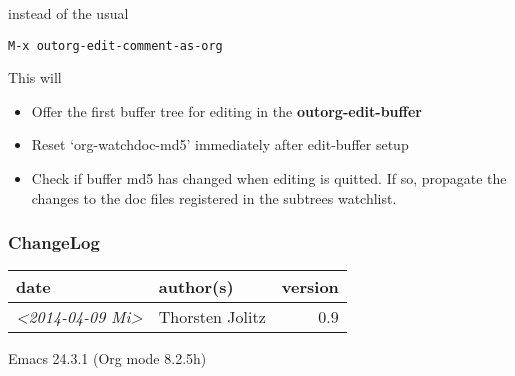 \documentclass[11pt]{article}
\begin{document}
instead of the usual 

\begin{verbatim}
M-x outorg-edit-comment-as-org
\end{verbatim}

This will

\begin{itemize}
\item Offer the first buffer tree for editing in the
\textbf{outorg-edit-buffer}

\item Reset `org-watchdoc-md5' immediately after edit-buffer setup

\item Check if buffer md5 has changed when editing is quitted. If so,
propagate the changes to the doc files registered in the subtrees
watchlist.
\end{itemize}
\subsubsection{ChangeLog}
\label{sec-1-4-4}

\begin{center}
\begin{tabular}{llr}
date & author(s) & version\\
\hline
\textit{<2014-04-09 Mi>} & Thorsten Jolitz & 0.9\\
\end{tabular}
\end{center}
Emacs 24.3.1 (Org mode 8.2.5h)
\end{document}
